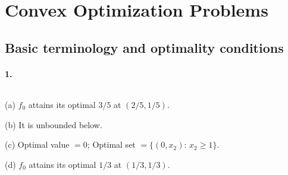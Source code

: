 \section{Convex Optimization Problems}
\subsection{Basic terminology and optimality conditions}
  \paragraph{1.}
  \begin{solution}
    $\,$\par
    (a) $f_0$ attains its optimal $3/5$ at $(2/5, 1/5)$.\par
    (b) It is unbounded below.\par
    (c) Optimal value $=0$; Optimal set $=\{(0,x_2):\,x_2\ge 1\}$.\par
    (d) $f_0$ attains its optimal $1/3$ at $(1/3, 1/3)$.\par
  \end{solution}

